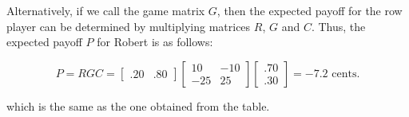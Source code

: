 \begin{solution}
    Alternatively, if we call the game matrix \( G \), then the expected payoff for the row player can be determined by multiplying matrices \( R \), \( G \) and \( C \). Thus, the expected payoff \( P \) for Robert is as follows:

    \[
        P = RGC = \begin{bmatrix} .20 & .80 \end{bmatrix} \begin{bmatrix} 10 & -10 \\ -25 & 25 \end{bmatrix} \begin{bmatrix} .70 \\ .30 \end{bmatrix} = -7.2 \text{ cents}.
    \]

    which is the same as the one obtained from the table.

\end{solution}

